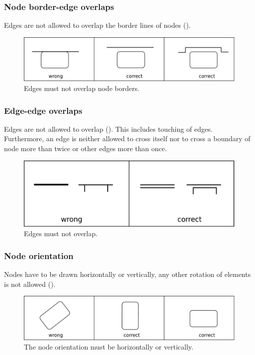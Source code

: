 \subsubsection{Node border-edge overlaps}

Edges are not allowed to overlap the border lines of nodes ().

\begin{figure}[h!]
  \centering
  \includegraphics[scale=0.3]{images/layout-node-border-edge}
  \caption{Edges must not overlap node borders.}\label{fig:layout3}
\end{figure}

\subsubsection{Edge-edge overlaps}

Edges are not allowed to overlap (). This includes touching of edges. Furthermore, an edge is neither allowed to cross itself nor to cross a boundary of node more than twice or other edges more than once.

\begin{figure}[h!]
  \centering
  \includegraphics[scale=0.3]{images/layout-edge-edge}
  \caption{Edges must not overlap.}\label{fig:layout4}
\end{figure}

\subsubsection{Node orientation}

Nodes have to be drawn horizontally or vertically, any other rotation of elements is not allowed ().

\begin{figure}[h!]
  \centering
  \includegraphics[scale=0.3]{images/layout-orientation}
  \caption{The node orientation must be horizontally or vertically.}\label{fig:layout5}
\end{figure}

